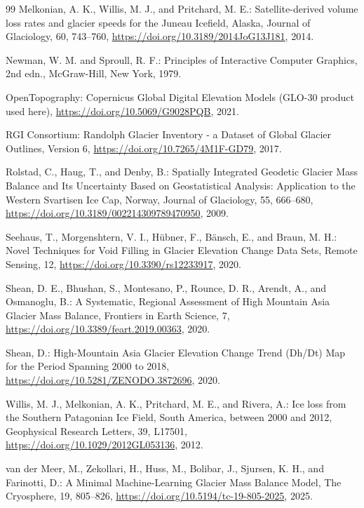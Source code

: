 \begin{thebibliography}{99}
 Melkonian, A. K., Willis, M. J., and Pritchard, M. E.: Satellite-derived volume loss rates and glacier speeds for the Juneau Icefield, Alaska, Journal of Glaciology, 60, 743–760, \url{https://doi.org/10.3189/2014JoG13J181}, 2014.

 Newman, W. M. and Sproull, R. F.: Principles of Interactive Computer Graphics, 2nd edn., McGraw-Hill, New York, 1979.

 OpenTopography: Copernicus Global Digital Elevation Models (GLO-30 product used here), \url{https://doi.org/10.5069/G9028PQB}, 2021.

 RGI Consortium: Randolph Glacier Inventory - a Dataset of Global Glacier Outlines, Version 6, \url{https://doi.org/10.7265/4M1F-GD79}, 2017.

 Rolstad, C., Haug, T., and Denby, B.: Spatially Integrated Geodetic Glacier Mass Balance and Its Uncertainty Based on Geostatistical Analysis: Application to the Western Svartisen Ice Cap, Norway, Journal of Glaciology, 55, 666–680, \url{https://doi.org/10.3189/002214309789470950}, 2009.

 Seehaus, T., Morgenshtern, V. I., Hübner, F., Bänsch, E., and Braun, M. H.: Novel Techniques for Void Filling in Glacier Elevation Change Data Sets, Remote Sensing, 12, \url{https://doi.org/10.3390/rs12233917}, 2020.

 Shean, D. E., Bhushan, S., Montesano, P., Rounce, D. R., Arendt, A., and Osmanoglu, B.: A Systematic, Regional Assessment of High Mountain Asia Glacier Mass Balance, Frontiers in Earth Science, 7, \url{https://doi.org/10.3389/feart.2019.00363}, 2020.

 Shean, D.: High-Mountain Asia Glacier Elevation Change Trend (Dh/Dt) Map for the Period Spanning 2000 to 2018, \url{https://doi.org/10.5281/ZENODO.3872696}, 2020.

 Willis, M. J., Melkonian, A. K., Pritchard, M. E., and Rivera, A.: Ice loss from the Southern Patagonian Ice Field, South America, between 2000 and 2012, Geophysical Research Letters, 39, L17501, \url{https://doi.org/10.1029/2012GL053136}, 2012.

 van der Meer, M., Zekollari, H., Huss, M., Bolibar, J., Sjursen, K. H., and Farinotti, D.: A Minimal Machine-Learning Glacier Mass Balance Model, The Cryosphere, 19, 805–826, \url{https://doi.org/10.5194/tc-19-805-2025}, 2025.

\end{thebibliography}
